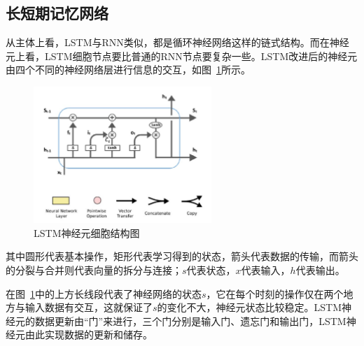 %

\subsection{长短期记忆网络}
从主体上看，LSTM与RNN类似，都是循环神经网络这样的链式结构。而在神经元上看，LSTM细胞节点要比普通的RNN节点要复杂一些。LSTM改进后的神经元由四个不同的神经网络层进行信息的交互，如图~\ref{fig:lstmc}所示。

\begin{figure}[!htb]
  \centering
  \includegraphics[width=0.6\textwidth]{figures/lstmc.png}
  \caption{LSTM神经元细胞结构图}
  \label{fig:lstmc}
\end{figure}
\hspace{-2em}其中圆形代表基本操作，矩形代表学习得到的状态，箭头代表数据的传输，而箭头的分裂与合并则代表向量的拆分与连接；$s$代表状态，$x$代表输入，$h$代表输出。

在图~\ref{fig:lstmc}中的上方长线段代表了神经网络的状态$s$，它在每个时刻的操作仅在两个地方与输入数据有交互，这就保证了$s$的变化不大，神经元状态比较稳定。LSTM神经元的数据更新由“门”来进行，三个门分别是输入门、遗忘门和输出门，LSTM神经元由此实现数据的更新和储存。

